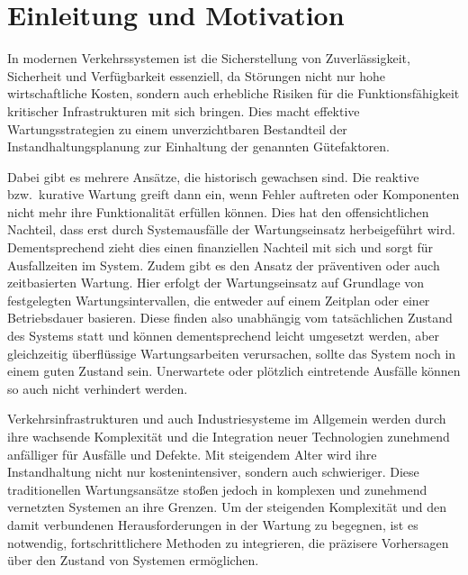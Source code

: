 \chapter{Einleitung und Motivation}
In modernen Verkehrssystemen ist die Sicherstellung von Zuverlässigkeit, Sicherheit und Verfügbarkeit essenziell,
da Störungen nicht nur hohe wirtschaftliche Kosten, sondern auch erhebliche Risiken für die Funktionsfähigkeit
kritischer Infrastrukturen mit sich bringen. Dies macht effektive Wartungsstrategien zu einem unverzichtbaren
Bestandteil der Instandhaltungsplanung zur Einhaltung der genannten Gütefaktoren.

Dabei gibt es mehrere Ansätze, die historisch gewachsen sind. Die reaktive bzw.~kurative Wartung greift dann ein,
wenn Fehler auftreten oder Komponenten nicht mehr ihre Funktionalität erfüllen können. Dies hat den offensichtlichen
Nachteil, dass erst durch Systemausfälle der Wartungseinsatz herbeigeführt wird. Dementsprechend zieht dies einen
finanziellen Nachteil mit sich und sorgt für Ausfallzeiten im System. Zudem gibt es den Ansatz der präventiven oder
auch zeitbasierten Wartung. Hier erfolgt der Wartungseinsatz auf Grundlage von festgelegten Wartungsintervallen, die entweder auf einem
Zeitplan oder einer Betriebsdauer basieren. Diese finden also unabhängig vom tatsächlichen Zustand des Systems statt
und können dementsprechend leicht umgesetzt werden, aber gleichzeitig überflüssige Wartungsarbeiten verursachen, sollte das
System noch in einem guten Zustand sein. Unerwartete oder plötzlich eintretende Ausfälle können so auch nicht
verhindert werden.

% 

Verkehrsinfrastrukturen und auch Industriesysteme im Allgemein werden durch ihre wachsende Komplexität und die Integration neuer
Technologien zunehmend anfälliger für Ausfälle und Defekte. Mit steigendem Alter wird ihre Instandhaltung nicht nur kostenintensiver,
sondern auch schwieriger. Diese traditionellen Wartungsansätze stoßen jedoch in komplexen und zunehmend vernetzten Systemen an ihre
Grenzen. Um der steigenden Komplexität und den damit verbundenen Herausforderungen in der Wartung zu begegnen, ist es notwendig,
fortschrittlichere Methoden zu integrieren, die präzisere Vorhersagen über den Zustand von Systemen ermöglichen.

